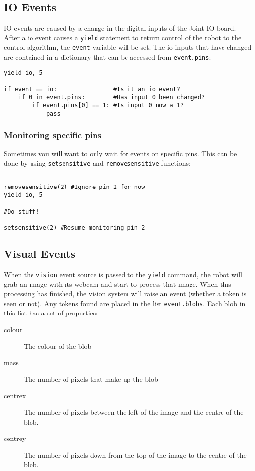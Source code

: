 \documentclass{article}
\begin{document}
\subsection{IO Events}
IO events are caused by a change in the digital inputs of the
Joint IO board. After a io event causes a \texttt{yield} statement to
return control of the robot to the control algorithm, the
\texttt{event} variable will be set. The io inputs that have changed
are contained in a dictionary that can be accessed from \texttt{event.pins}: 

\begin{verbatim}
yield io, 5

if event == io:                #Is it an io event?
    if 0 in event.pins:        #Has input 0 been changed?
        if event.pins[0] == 1: #Is input 0 now a 1?
            pass
\end{verbatim}

\subsubsection{Monitoring specific pins}
Sometimes you will want to only wait for events on specific pins.  This can be
done by using \texttt{setsensitive} and \texttt{removesensitive} functions:

\begin{verbatim}

removesensitive(2) #Ignore pin 2 for now
yield io, 5

#Do stuff!

setsensitive(2) #Resume monitoring pin 2
\end{verbatim}

\subsection{Visual Events}
When the \texttt{vision} event source is passed to the \texttt{yield}
command, the robot will grab an image with its webcam and start to
process that image.  When this processing has finished, the vision
system will raise an event (whether a token is seen or not).  Any
tokens found are placed in the list \texttt{event.blobs}.  Each blob in this
list has a set of properties:  
\begin{description}
\item[colour] The colour of the blob
\item[mass] The number of pixels that make up the blob
\item[centrex] The number of pixels between the left of the image and
  the centre of the blob.
\item[centrey] The number of pixels down from the top of the image to the
  centre of the blob.
\end{description}
\end{document}
